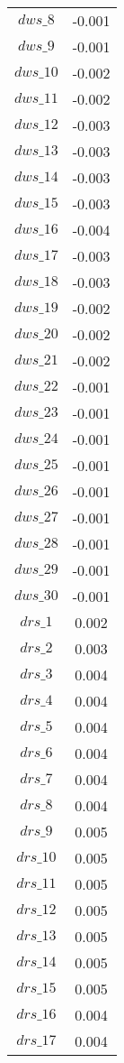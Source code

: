 \begin{center}
\begin{longtable}{cc}
$dws\_8$ 	 & 	 -0.001 \\
$dws\_9$ 	 & 	 -0.001 \\
$dws\_10$ 	 & 	 -0.002 \\
$dws\_11$ 	 & 	 -0.002 \\
$dws\_12$ 	 & 	 -0.003 \\
$dws\_13$ 	 & 	 -0.003 \\
$dws\_14$ 	 & 	 -0.003 \\
$dws\_15$ 	 & 	 -0.003 \\
$dws\_16$ 	 & 	 -0.004 \\
$dws\_17$ 	 & 	 -0.003 \\
$dws\_18$ 	 & 	 -0.003 \\
$dws\_19$ 	 & 	 -0.002 \\
$dws\_20$ 	 & 	 -0.002 \\
$dws\_21$ 	 & 	 -0.002 \\
$dws\_22$ 	 & 	 -0.001 \\
$dws\_23$ 	 & 	 -0.001 \\
$dws\_24$ 	 & 	 -0.001 \\
$dws\_25$ 	 & 	 -0.001 \\
$dws\_26$ 	 & 	 -0.001 \\
$dws\_27$ 	 & 	 -0.001 \\
$dws\_28$ 	 & 	 -0.001 \\
$dws\_29$ 	 & 	 -0.001 \\
$dws\_30$ 	 & 	 -0.001 \\
$drs\_1$ 	 & 	 0.002 \\
$drs\_2$ 	 & 	 0.003 \\
$drs\_3$ 	 & 	 0.004 \\
$drs\_4$ 	 & 	 0.004 \\
$drs\_5$ 	 & 	 0.004 \\
$drs\_6$ 	 & 	 0.004 \\
$drs\_7$ 	 & 	 0.004 \\
$drs\_8$ 	 & 	 0.004 \\
$drs\_9$ 	 & 	 0.005 \\
$drs\_10$ 	 & 	 0.005 \\
$drs\_11$ 	 & 	 0.005 \\
$drs\_12$ 	 & 	 0.005 \\
$drs\_13$ 	 & 	 0.005 \\
$drs\_14$ 	 & 	 0.005 \\
$drs\_15$ 	 & 	 0.005 \\
$drs\_16$ 	 & 	 0.004 \\
$drs\_17$ 	 & 	 0.004 \\

\end{longtable}
\end{center}
